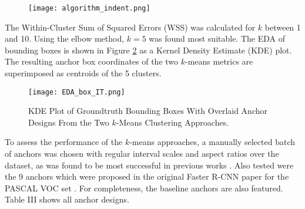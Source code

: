 \documentclass[journal]{IEEEtran}
\begin{document}
\begin{figure}[H]
    \centering
    \texttt{[image: algorithm\_indent.png]}
    \label{fig:algorithm_indent}
\end{figure}





The Within-Cluster Sum of Squared Errors (WSS) was calculated for $k$ between 1 and 10. Using the elbow method, $k=5$ was found most suitable. The EDA of bounding boxes is shown in Figure \ref{fig:EDA_box} as a Kernel Density Estimate (KDE) plot. The resulting anchor box coordinates of the two $k$-means metrics are superimposed as centroids of the 5 clusters. 

\begin{figure}[H]
    \centering
    \texttt{[image: EDA\_box\_IT.png]}
    \caption{KDE Plot of Groundtruth Bounding Boxes With Overlaid Anchor Designs From the Two $k$-Means Clustering Approaches.}
    \label{fig:EDA_box}
\end{figure}


To assess the performance of the $k$-means approaches, a manually selected batch of anchors was chosen with regular interval scales and aspect ratios over the dataset, as was found to be most successful in previous works \cite{comparisonpaper}. Also tested were the 9 anchors which were proposed in the original Faster R-CNN paper for the PASCAL VOC set \cite{fasterrcnn}. For completeness, the baseline anchors are also featured. Table III %
shows all anchor designs.
\end{document}
